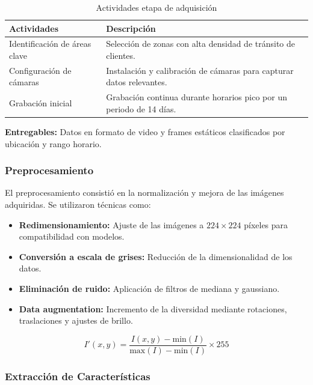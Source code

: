 \begin{table}[H]
\centering
\caption{Actividades etapa de adquisición}
\label{table:adquisicion}
\begin{tabular}{|p{5cm}|p{8cm}|}
\hline
\textbf{Actividades} & \textbf{Descripción} \\ \hline
Identificación de áreas clave & Selección de zonas con alta densidad de tránsito de clientes. \\ \hline
Configuración de cámaras & Instalación y calibración de cámaras para capturar datos relevantes. \\ \hline
Grabación inicial & Grabación continua durante horarios pico por un periodo de 14 días. \\ \hline
\end{tabular}
\end{table}

\textbf{Entregables:} Datos en formato de video y frames estáticos clasificados por ubicación y rango horario.

\subsubsection{Preprocesamiento}

El preprocesamiento consistió en la normalización y mejora de las imágenes adquiridas. Se utilizaron técnicas como:

\begin{itemize}
    \item \textbf{Redimensionamiento:} Ajuste de las imágenes a $224 \times 224$ píxeles para compatibilidad con modelos.
    \item \textbf{Conversión a escala de grises:} Reducción de la dimensionalidad de los datos.
    \item \textbf{Eliminación de ruido:} Aplicación de filtros de mediana y gaussiano.
    \item \textbf{Data augmentation:} Incremento de la diversidad mediante rotaciones, traslaciones y ajustes de brillo.
\end{itemize}

\begin{equation}
I'(x, y) = \frac{I(x, y) - \text{min}(I)}{\text{max}(I) - \text{min}(I)} \times 255
\label{eq:normalization}
\end{equation}

\subsubsection{Extracción de Características}

